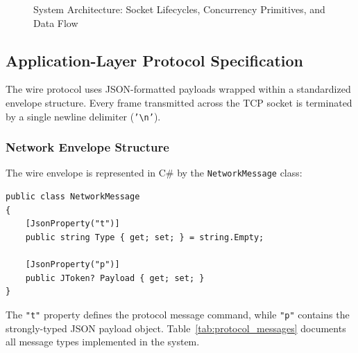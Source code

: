 \documentclass[12pt,a4paper]{article}
\begin{document}
\begin{figure}[htbp]
{%
}
\caption{System Architecture: Socket Lifecycles, Concurrency Primitives, and Data Flow}
\label{fig:system_arch}
\end{figure}

\subsection{Application-Layer Protocol Specification}
The wire protocol uses JSON-formatted payloads wrapped within a standardized envelope structure. Every frame transmitted across the TCP socket is terminated by a single newline delimiter (\texttt{'\textbackslash n'}).

\subsubsection{Network Envelope Structure}
The wire envelope is represented in C\# by the \texttt{NetworkMessage} class:
\begin{lstlisting}
public class NetworkMessage
{
    [JsonProperty("t")]
    public string Type { get; set; } = string.Empty;

    [JsonProperty("p")]
    public JToken? Payload { get; set; }
}
\end{lstlisting}
The \texttt{"t"} property defines the protocol message command, while \texttt{"p"} contains the strongly-typed JSON payload object. Table~\ref{tab:protocol_messages} documents all message types implemented in the system.
\end{document}
